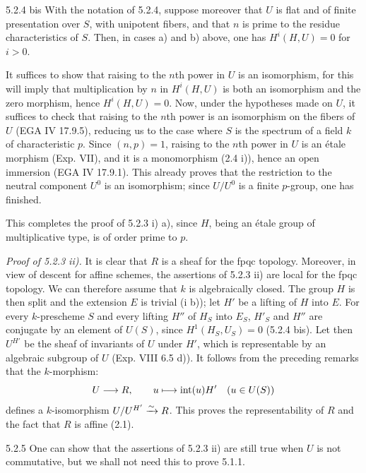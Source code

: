 \begin{corollary}{5.2.4 bis}\label{XVII.5.2.4bis}
With the notation of 5.2.4, suppose moreover that $U$ is flat and of finite presentation over $S$, with unipotent fibers, and that $n$ is prime to the residue characteristics of $S$. Then, in cases a) and b) above, one has $H^i(H,U)=0$ for $i>0$.
\end{corollary}
It suffices to show that raising to the $n$th power in $U$ is an isomorphism, for this will imply that multiplication by $n$ in $H^i(H,U)$ is both an isomorphism and the zero morphism, hence $H^i(H,U)=0$. Now, under the hypotheses made on $U$, it suffices to check that raising to the $n$th power is an isomorphism on the fibers of $U$ (EGA IV 17.9.5), reducing us to the case where $S$ is the spectrum of a field $k$ of characteristic $p$. Since $(n,p)=1$, raising to the $n$th power in $U$ is an étale morphism (Exp. VII), and it is a monomorphism (2.4 i)), hence an open immersion (EGA IV 17.9.1). This already proves that the restriction to the neutral component $U^0$ is an isomorphism; since $U/U^0$ is a finite $p$-group, one has finished.

This completes the proof of 5.2.3 i) a), since $H$, being an étale group of multiplicative type, is of order prime to $p$.

\noindent\emph{Proof of 5.2.3 ii).} It is clear that $R$ is a sheaf for the fpqc topology. Moreover, in view of descent for affine schemes, the assertions of 5.2.3 ii) are local for the fpqc topology. We can therefore assume that $k$ is algebraically closed. The group $H$ is then split and the extension $E$ is trivial (i b)); let $H'$ be a lifting of $H$ into $E$. For every $k$-prescheme $S$ and every lifting $H''$ of $H_S$ into $E_S$, $H'_S$ and $H''$ are conjugate by an element of $U(S)$, since $H^1(H_S,U_S)=0$ (5.2.4 bis). Let then $U^{H'}$ be the sheaf of invariants of $U$ under $H'$, which is representable by an algebraic subgroup of $U$ (Exp. VIII 6.5 d)). It follows from the preceding remarks that the $k$-morphism:
\[
 U\longrightarrow R,\qquad u\longmapsto\operatorname{int}(u)H'\quad(u\in U(S))
\]
defines a $k$-isomorphism $U/U^{H'}\xrightarrow{\sim} R$. This proves the representability of $R$ and the fact that $R$ is affine (2.1).

\begin{remark}{5.2.5}\label{XVII.5.2.5}
One can show that the assertions of 5.2.3 ii) are still true when $U$ is not commutative, but we shall not need this to prove 5.1.1.
\end{remark}

